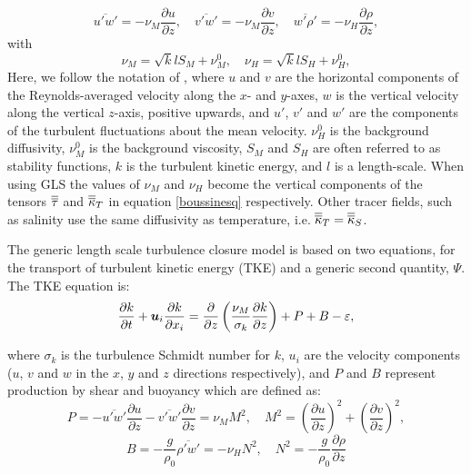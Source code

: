 \begin{equation}
\overline{u'w'} = -\nu_M\frac{\partial u}{\partial z},\quad
\overline{v'w'} = -\nu_M\frac{\partial v}{\partial z},\quad
\overline{w'\rho'} = -\nu_H\frac{\partial\rho}{\partial z},
\end{equation}
with
\begin{equation}
\nu_M = \sqrt{k}lS_{M}+\nu_M^0, \quad
\nu_H = \sqrt{k}lS_{H}+\nu_H^0,
\label{eq:diff}
\end{equation}
Here, we follow the notation of \citet{umlauf2003}, where $u$ and $v$ are the 
horizontal components of the Reynolds-averaged velocity along the $x$- and $y$-axes, 
$w$ is the vertical velocity along the vertical $z$-axis, positive upwards, and 
$u'$, $v'$ and $w'$ are the components of the turbulent fluctuations about the 
mean velocity. $\nu_H^0$ is the background diffusivity, $\nu_M^0$ is the background viscosity, 
$S_{M}$ and $S_{H}$ are often referred to as stability functions, $k$ is the turbulent kinetic energy,
and $l$ is a length-scale. When using GLS the values of $\nu_M$ and $\nu_H$ become the 
vertical components of the tensors $\overline{\overline{\tau}}$ and $\overline{\overline{\kappa}}_T$ 
in equation \ref{boussinesq} respectively. Other tracer fields, such as 
salinity use the same diffusivity as temperature, i.e. $\overline{\overline{\kappa}}_T = \overline{\overline{\kappa}}_S$.

The generic length scale turbulence closure model \citep{umlauf2003} is based
on two equations, for the transport of turbulent kinetic energy (TKE) and a
generic second quantity, $\Psi$. The TKE equation is:
\begin{equation}
\frac{\partial k}{\partial t} + {\mbox{\boldmath$u$}}_i\frac{\partial k}{\partial x_i} =
\frac{\partial}{\partial z}\left(\frac{\nu_M}{\sigma_k}\frac{\partial k}{\partial z}\right) + P + B - \varepsilon,
\label{eq:tke_one}
\end{equation}

\noindent 
where $\sigma_k$ is the turbulence Schmidt number for $k$, $u_i$ are the
velocity components ($u$, $v$ and $w$ in the $x$, $y$ and $z$ directions 
respectively), and $P$ and $B$ represent production by shear and buoyancy
which are defined as:
\begin{equation}
P=-\overline{u'w'}\frac{\partial u}{\partial z}-\overline{v'w'}
\frac{\partial v}{\partial z}=\nu_MM^2, \quad M^2=
\left(\frac{\partial u}{\partial z}\right)^2 + \left(\frac{\partial v}{\partial z}\right)^2,
\end{equation}
\begin{equation}
B=-\frac{g}{\rho_0}\overline{\rho'w'}=-\nu_HN^2, \quad N^2= -\frac{g}{\rho_0}\frac{\partial\rho}{\partial z}
\end{equation}

